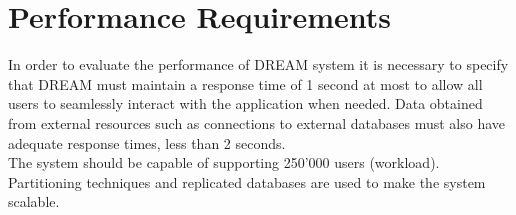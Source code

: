 \section{Performance Requirements}

In order to evaluate the performance of DREAM system it is necessary to specify that DREAM must maintain a response time of 1 second at most to allow all users to seamlessly interact with the application when needed. Data obtained from external resources such as connections to external databases must also have adequate response times, less than 2 seconds.\\
The system should be capable of supporting 250'000 users (workload).\\
Partitioning techniques and replicated databases are used to make the system scalable.